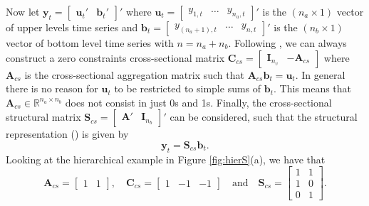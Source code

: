 \documentclass[a4paper,11pt]{article}
\newcommand{\bvet}{\bm{b}}
\newcommand{\uvet}{\bm{u}}
\newcommand{\yvet}{\bm{y}}
\newcommand{\Avet}{\bm{A}}
\newcommand{\Cvet}{\bm{C}}
\newcommand{\Ivet}{\bm{I}}
\newcommand{\Svet}{\bm{S}}
\theoremstyle{definition}
\begin{document}
Now let $\yvet_t = \begin{bmatrix}
	\uvet_t' & \bvet_t'
\end{bmatrix}'$ where $\uvet_t = \begin{bmatrix} y_{1,t} & \dots & y_{n_a,t}
\end{bmatrix}'$ is the $(n_a \times 1)$ vector of upper levels time series and $\bvet_t = \begin{bmatrix} y_{(n_a+1),t} & \dots & y_{n,t} \end{bmatrix}'$ is the $(n_b \times 1)$ vector of bottom level time series with $n = n_a+n_b$. Following \cite{giro2022}, we can always construct a zero constraints cross-sectional matrix $\Cvet_{cs}=\begin{bmatrix}
	\Ivet_{n_v} & -\Avet_{cs}
\end{bmatrix}$ where $\Avet_{cs}$ is the cross-sectional aggregation matrix such that $\Avet_{cs}\bvet_t = \uvet_t$. In general there is no reason for $\uvet_t$ to be restricted to simple sums of $\bvet_t$. This means that $\Avet_{cs} \in \mathbb{R}^{n_a\times n_b}$ does not consist in just 0s and 1s. Finally, the cross-sectional structural matrix $\Svet_{cs} = \begin{bmatrix}\Avet' & \Ivet_{n_b}\end{bmatrix}'$ can be considered, such that the structural representation (\citealp{hyndman2011}) is given by
$$
\yvet_t = \Svet_{cs} \bvet_t.
$$
Looking at the hierarchical example in Figure \ref{fig:hierS}(a), we have that
$$
\Avet_{cs} = \begin{bmatrix} 1 & 1 \end{bmatrix}, \quad \Cvet_{cs} = \begin{bmatrix}1 & -1 & -1 \end{bmatrix} \quad \text{and} \quad \Svet_{cs} = \begin{bmatrix}
1 & 1 \\
1 & 0 \\
0 & 1
\end{bmatrix}.
$$


\end{document}
